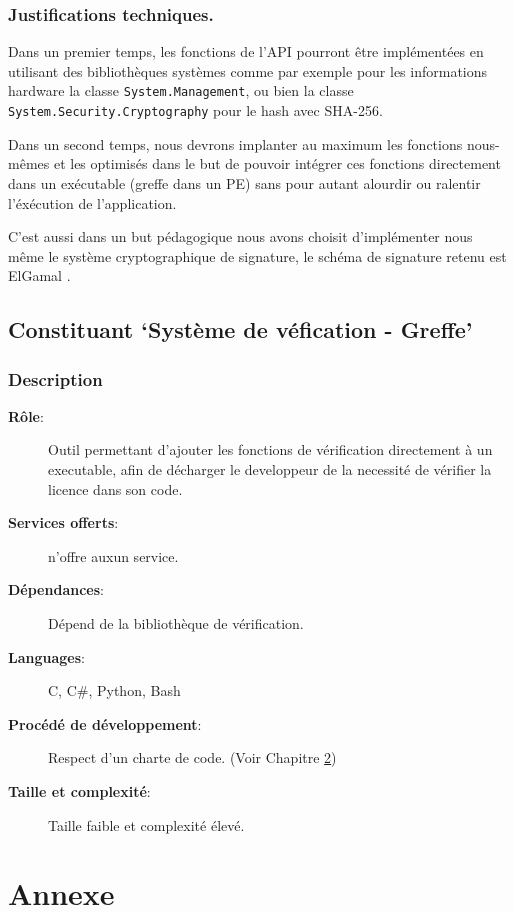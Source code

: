 \subsection{Justifications techniques.}
Dans un premier temps, les fonctions de l'API pourront être implémentées en utilisant des bibliothèques systèmes comme par exemple pour les informations hardware la 
classe \verb:System.Management:, ou bien la classe \verb:System.Security.Cryptography: 
pour le hash avec SHA-256.\newline

Dans un second temps, nous devrons implanter au maximum les fonctions nous-mêmes et 
les optimisés dans le but de pouvoir intégrer ces fonctions directement dans un 
exécutable (greffe dans un PE) sans pour autant alourdir ou ralentir l'éxécution de 
l'application. \newline

C'est aussi dans un but pédagogique nous avons choisit d'implémenter nous même le système cryptographique de signature, le schéma de signature retenu est ElGamal \cite{ElGamal}.

\section{Constituant `Système de véfication - Greffe'}
\subsection{Description}
\begin{description}
	\item[\textbf{Rôle}:]
			Outil permettant d'ajouter les fonctions de vérification directement à un
			executable, afin de décharger le developpeur de la necessité de vérifier 
			la licence dans son code.
	\item[\textbf{Services offerts}:]
		n'offre auxun service.
	\item[\textbf{Dépendances}:]
		Dépend de la bibliothèque de vérification.
	\item[\textbf{Languages}:]
		C, C\#, Python, Bash 
	\item[\textbf{Procédé de développement}:]
		Respect d'un charte de code. (Voir Chapitre \ref{chap:Annexe}) 
	\item[\textbf{Taille et complexité}:]
		Taille faible et complexité élevé.
\end{description}


\chapter{Annexe}
\label{chap:Annexe}


